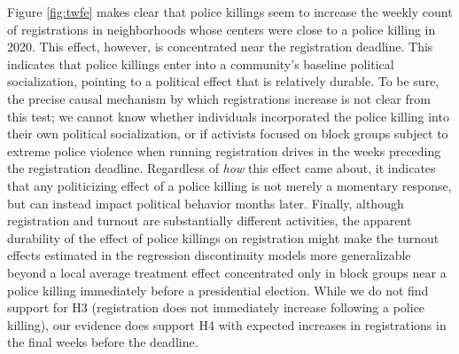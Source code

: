 \documentclass[12pt]{article}
\newcommand{\kscomment}[1]{\textbf{\textcolor{Thistle}{[[ #1 --- KS ]]}}}
\newcommand{\kmcomment}[1]{\textbf{\textcolor{JungleGreen}{[[ #1 --- KM ]]}}}
\begin{document}
Figure \ref{fig:twfe} makes clear that police killings seem to increase the weekly count of registrations in neighborhoods whose centers were close to a police killing in 2020. This effect, however, is concentrated near the registration deadline. This indicates that police killings enter into a community's baseline political socialization, pointing to a political effect that is relatively durable. To be sure, the precise causal mechanism by which registrations increase is not clear from this test; we cannot know whether individuals incorporated the police killing into their own political socialization, or if activists focused on block groups subject to extreme police violence when running registration drives in the weeks preceding the registration deadline. Regardless of \textit{how} this effect came about, it indicates that any politicizing effect of a police killing is not merely a momentary response, but can instead impact political behavior months later. Finally, although registration and turnout are substantially different activities, the apparent durability of the effect of police killings on registration might make the turnout effects estimated in the regression discontinuity models more generalizable beyond a local average treatment effect concentrated only in block groups near a police killing immediately before a presidential election. While we do not find support for H3 (registration does not immediately increase following a police killing), our evidence does support H4 with expected increases in registrations in the final weeks before the deadline.

\end{document}
